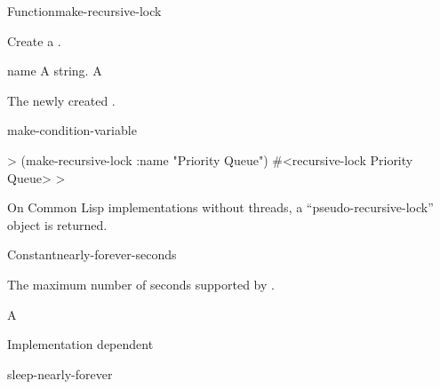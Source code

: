 \documentclass[10pt,twoside,english,pdftex]{article}
\begin{document}
\begin{functiondoc}{Function}{make-recursive-lock}{%
    }
%
%
%

\fnsyntax

\fnpurpose Create a .

\fnpackage {}

\fnmodule {}

\fnargs
\begin{args}{name}
\arg[name] A string.
\arg[lock] A 
\end{args}

\fnreturns The newly created . 

\begin{alsos}{make-condition-variable}
\end{alsos}

\fnexample
%
\W\supp
\begin{example}
  > (make-recursive-lock :name "Priority Queue")
  #<recursive-lock Priority Queue>
  >
\end{example}

\fnnote On Common Lisp implementations without threads, a
``pseudo-recursive-lock'' object is returned.

\end{functiondoc}


\begin{functiondoc}{Constant}{nearly-forever-seconds}{}%

%

%

\fnsyntax

\fnpurpose The maximum number of seconds supported by .

\fnpackage {}

\fnmodule {}

\fnvaluetype A 

\fnvalue Implementation dependent

\begin{alsos}{sleep-nearly-forever}
\end{alsos}

\end{functiondoc}
\end{document}
